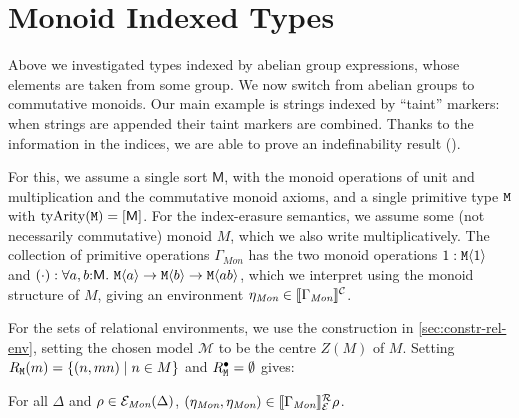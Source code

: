 \section{Monoid Indexed Types}
\label{sec:monoid-indexed-types}

\newcommand{\Mon}{\textit{Mon}}

Above we investigated types indexed by abelian group expressions,
whose elements are taken from some group. We now switch from abelian
groups to commutative monoids.  Our main example is strings indexed by
``taint'' markers: when strings are appended their taint markers are
combined. Thanks to the information in the indices, we are able to
prove an indefinability result ().

For this, we assume a single sort $\mathsf{M}$, with the monoid operations of
unit and multiplication and the commutative monoid axioms, and a %
single primitive type $\textup{\texttt{M}}$ with $\mathrm{tyArity}(\textup{\texttt{M}})
= [\mathsf{M}]$. For the index-erasure semantics, we assume some (not
necessarily commutative) monoid $M$, which we 
also write
multiplicatively. The collection of primitive operations
$\Gamma_{\mathit{Mon}}$ %
has the two monoid operations
$1 : \textup{\texttt{M}}\langle 1 \rangle$ and $(\cdot) : \forall
a,b\mathord:\mathsf{M}.\ \textup{\texttt{M}}\langle a \rangle \to \textup{\texttt{M}}\langle b \rangle \to
\textup{\texttt{M}}\langle a b \rangle$, which we interpret using the monoid structure of
$M$, giving an environment $\eta_\Mon \in \ctxtSem{\Gamma_\Mon}$.

For the sets of relational environments, we use %
the
construction in \autoref{sec:constr-rel-env}, setting the chosen model
$\mathcal{M}$ to be the centre $Z(M)$ of $M$. %
Setting $R_{\textup{\texttt{M}}}(m) = \{ (n,mn) \mathrel| n
\in M \}$ and $R^\bullet_{\textup{\texttt{M}}} = \emptyset$
gives:
\begin{lemma}
  For all $\Delta$ and $\rho \in \relEnv{E}_\Mon(\Delta)$,
  $(\eta_\Mon,\eta_\Mon) \in \rsem{\Gamma_\Mon}{\relEnv{E}}\rho$.
\end{lemma}

